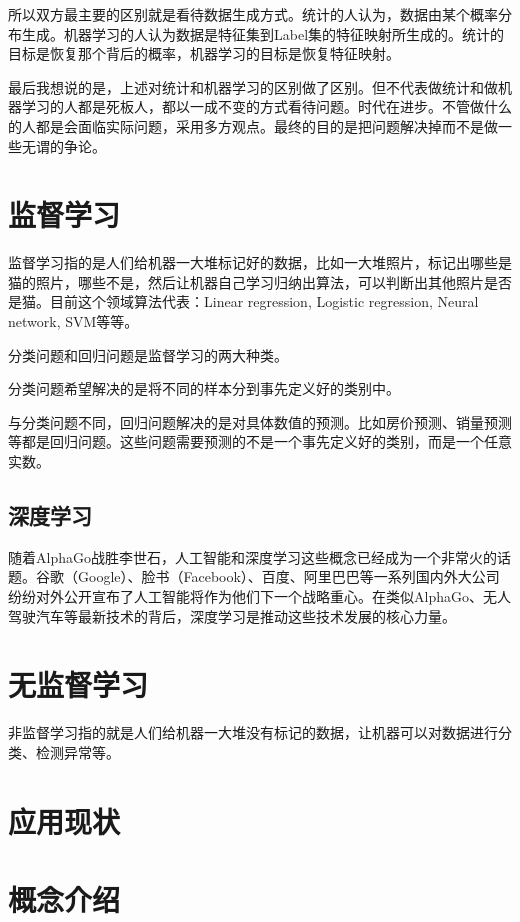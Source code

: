 \documentclass[10pt,a4paper]{ctexbook}
\begin{document}
所以双方最主要的区别就是看待数据生成方式。统计的人认为，数据由某个概率分布生成。机器学习的人认为数据是特征集到Label集的特征映射所生成的。统计的目标是恢复那个背后的概率，机器学习的目标是恢复特征映射。

最后我想说的是，上述对统计和机器学习的区别做了区别。但不代表做统计和做机器学习的人都是死板人，都以一成不变的方式看待问题。时代在进步。不管做什么的人都是会面临实际问题，采用多方观点。最终的目的是把问题解决掉而不是做一些无谓的争论。


\section{监督学习}
监督学习指的是人们给机器一大堆标记好的数据，比如一大堆照片，标记出哪些是猫的照片，哪些不是，然后让机器自己学习归纳出算法，可以判断出其他照片是否是猫。目前这个领域算法代表：Linear regression, Logistic regression, Neural network, SVM等等。 

分类问题和回归问题是监督学习的两大种类。

分类问题希望解决的是将不同的样本分到事先定义好的类别中。

与分类问题不同，回归问题解决的是对具体数值的预测。比如房价预测、销量预测等都是回归问题。这些问题需要预测的不是一个事先定义好的类别，而是一个任意实数。

\subsection{深度学习}
随着AlphaGo战胜李世石，人工智能和深度学习这些概念已经成为一个非常火的话题。谷歌（Google）、脸书（Facebook）、百度、阿里巴巴等一系列国内外大公司纷纷对外公开宣布了人工智能将作为他们下一个战略重心。在类似AlphaGo、无人驾驶汽车等最新技术的背后，深度学习是推动这些技术发展的核心力量。



\section{无监督学习}
非监督学习指的就是人们给机器一大堆没有标记的数据，让机器可以对数据进行分类、检测异常等。

\section{应用现状}
\section{概念介绍}
\end{document}
